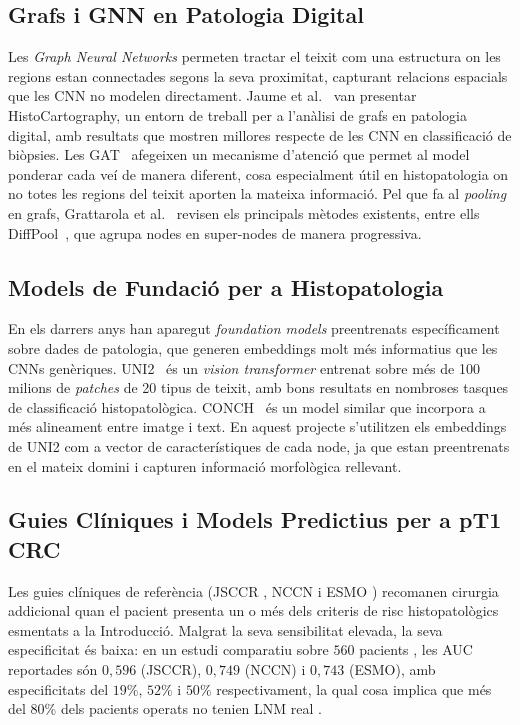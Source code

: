 \documentclass[10pt,a4paper,twocolumn,twoside]{article}
\begin{document}
\subsection{Grafs i GNN en Patologia Digital}

Les \textit{Graph Neural Networks} permeten tractar el teixit com una estructura on les
regions estan connectades segons la seva proximitat, capturant relacions espacials que les
CNN no modelen directament. Jaume et al.~\cite{jaume2021histocartographytoolkitgraphanalytics}
van presentar HistoCartography, un entorn de treball per a l'anàlisi de grafs en patologia
digital, amb resultats que mostren millores respecte de les CNN en classificació de
biòpsies. Les GAT~\cite{veličković2018graphattentionnetworks} afegeixen un mecanisme
d'atenció que permet al model ponderar cada veí de manera diferent, cosa especialment útil
en histopatologia on no totes les regions del teixit aporten la mateixa informació. Pel que
fa al \textit{pooling} en grafs, Grattarola et al.~\cite{Grattarola_2024} revisen els
principals mètodes existents, entre ells DiffPool~\cite{ying2019hierarchicalgraphrepresentationlearning},
que agrupa nodes en super-nodes de manera progressiva.

\subsection{Models de Fundació per a Histopatologia}

En els darrers anys han aparegut \textit{foundation models} preentrenats específicament
sobre dades de patologia, que generen embeddings molt més informatius que les CNNs
genèriques. UNI2~\cite{chen2024uni2} és un \textit{vision transformer} entrenat sobre
més de 100 milions de \textit{patches} de 20 tipus de teixit, amb bons resultats en
nombroses tasques de classificació histopatològica. CONCH~\cite{lu2024conch} és un model
similar que incorpora a més alineament entre imatge i text. En aquest projecte s'utilitzen
els embeddings de UNI2 com a vector de característiques de cada node, ja que estan
preentrenats en el mateix domini i capturen informació morfològica rellevant.

\subsection{Guies Clíniques i Models Predictius per a pT1 CRC}
\label{sec:guidelines-sota}

Les guies clíniques de referència (JSCCR \cite{jsccr2019}, NCCN i
ESMO \cite{esge2022}) recomanen cirurgia addicional quan el pacient
presenta un o més dels criteris de risc histopatològics esmentats a la
Introducció. Malgrat la seva sensibilitat elevada, la seva especificitat
és baixa: en un estudi comparatiu sobre $560$ pacients
\cite{tanino2024comparative}, les AUC reportades són $0{,}596$ (JSCCR),
$0{,}749$ (NCCN) i $0{,}743$ (ESMO), amb especificitats del $19\%$, $52\%$
i $50\%$ respectivament, la qual cosa implica que més del $80\%$ dels
pacients operats no tenien LNM real \cite{tanino2024comparative,zaffalon2023}.
\end{document}
